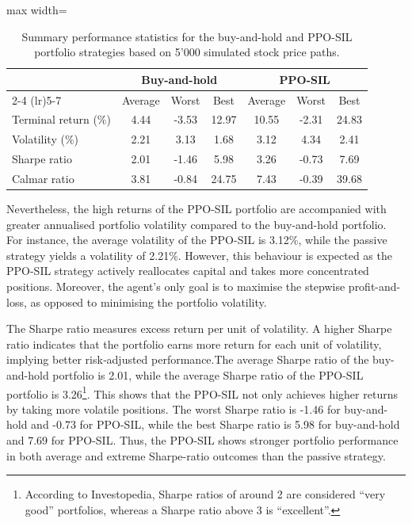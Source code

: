 \begin{table}[!htbp]
    \centering
    \small
    \setlength{\tabcolsep}{5pt}
    \renewcommand{\arraystretch}{0.95}

    \begin{adjustbox}{max width=\textwidth}
    \begin{tabular}{@{}lccc ccc@{}}
        \toprule
        & \multicolumn{3}{c}{Buy-and-hold}
        & \multicolumn{3}{c}{PPO-SIL} \\
        \cmidrule(lr){2-4}
        \cmidrule(lr){5-7}
        & Average & Worst & Best
        & Average & Worst & Best \\
        \midrule
        Terminal return (\%) & 4.44 & -3.53 & 12.97 & 10.55 & -2.31 & 24.83 \\
        Volatility (\%)      & 2.21 & 3.13  & 1.68  & 3.12  & 4.34  & 2.41 \\
        Sharpe ratio         & 2.01 & -1.46 & 5.98  & 3.26  & -0.73 & 7.69 \\
        Calmar ratio         & 3.81 & -0.84 & 24.75 & 7.43  & -0.39 & 39.68 \\
        \bottomrule
    \end{tabular}
    \end{adjustbox}

    \caption{Summary performance statistics for the buy-and-hold and PPO-SIL portfolio strategies based on 5'000 simulated stock price paths.}
    \label{tab: portfolio performance summary}
\end{table}

Nevertheless, the high returns of the PPO-SIL portfolio are accompanied with greater annualised portfolio volatility compared to the buy-and-hold portfolio. For instance, the average volatility of the PPO-SIL is 3.12\%, while the passive strategy yields a volatility of 2.21\%. However, this behaviour is expected as the PPO-SIL strategy actively reallocates capital and takes more concentrated positions. Moreover, the agent's only goal is to maximise the stepwise profit-and-loss, as opposed to minimising the portfolio volatility. 

The Sharpe ratio measures excess return per unit of volatility. A higher Sharpe ratio indicates that the portfolio earns more return for each unit of volatility, implying better risk‑adjusted performance.The average Sharpe ratio of the buy-and-hold portfolio is 2.01, while the average Sharpe ratio of the PPO-SIL portfolio is 3.26\footnote{According to Investopedia, Sharpe ratios of around 2 are considered ``very good'' portfolios, whereas a Sharpe ratio above 3 is ``excellent''.}. This shows that the PPO-SIL not only achieves higher returns by taking more volatile positions. The worst Sharpe ratio is -1.46 for buy-and-hold and -0.73 for PPO-SIL, while the best Sharpe ratio is 5.98 for buy-and-hold and 7.69 for PPO-SIL. Thus, the PPO-SIL shows stronger portfolio performance in both average and extreme Sharpe-ratio outcomes than the passive strategy. 


